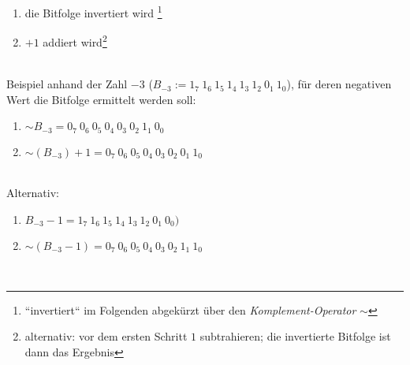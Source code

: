 \begin{enumerate}
    \item die Bitfolge invertiert wird \footnote{``invertiert`` im Folgenden abgekürzt über den \textit{Komplement-Operator} $\sim$}
    \item $+1$ addiert wird\footnote{alternativ: vor dem ersten Schritt $1$ subtrahieren; die invertierte Bitfolge ist dann das Ergebnis}
\end{enumerate}\\

\noindent
Beispiel anhand der Zahl $-3$ ($B_{-3}:= 1_7\ 1_6\ 1_5\ 1_4\ 1_3\ 1_2\ 0_1\ 1_0$), für deren negativen Wert die Bitfolge ermittelt werden soll:

\begin{enumerate}
    \item $\sim B_{-3} = 0_7\ 0_6\ 0_5\ 0_4\ 0_3\ 0_2\ 1_1\ 0_0$
    \item $\sim (B_{-3}) + 1 = 0_7\ 0_6\ 0_5\ 0_4\ 0_3\ 0_2\ 0_1\ 1_0$
\end{enumerate}\\

Alternativ:
\begin{enumerate}
    \item $B_{-3} -1 = 1_7\ 1_6\ 1_5\ 1_4\ 1_3\ 1_2\ 0_1\ 0_0)$
    \item $\sim (B_{-3} - 1) = 0_7\ 0_6\ 0_5\ 0_4\ 0_3\ 0_2\ 1_1\ 1_0$
\end{enumerate}\\

